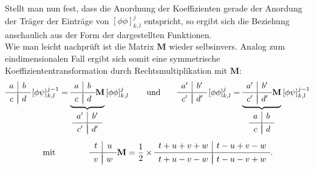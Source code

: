 %
Stellt man nun fest, dass die Anordnung der Koeffizienten gerade der Anordung der Träger der Einträge von $\left[ \phi\phi \right]_{k,l}^j$ entspricht, so ergibt sich die Beziehung anschaulich aus der Form der dargestellten Funktionen.\\
%
Wie man leicht nachprüft ist die Matrix $\mathbf{M}$ wieder selbsinvers. Analog zum eindimensionalen Fall ergibt sich somit eine symmetrische Koeffiziententransformation durch Rechtsmultiplikation mit $\mathbf{M}$:
%
\[
\begin{array}{c|c}
a & b \\[.05cm] 
\hline \\[-0.35cm]
c & d
\end{array}
\left[ \phi\psi \right]_{k,l}^{j-1}
=
\underbrace{
\begin{array}{c|c}
a & b \\[.05cm] 
\hline \\[-0.35cm]
c & d
\end{array}
\mathbf{M}
}_{
\begin{array}{c|c}
a' & b' \\[.05cm] 
\hline \\[-0.35cm]
c' & d'
\end{array}
}
\left[ \phi\phi \right]_{k,l}^j
\qquad \mbox{und} \qquad
\begin{array}{c|c}
a' & b' \\[.05cm] 
\hline \\[-0.35cm]
c' & d'
\end{array}
\left[ \phi\phi \right]_{k,l}^{j}
=
\underbrace{
\begin{array}{c|c}
a' & b' \\[.05cm] 
\hline \\[-0.35cm]
c' & d'
\end{array}
\mathbf{M}
}_{
\begin{array}{c|c}
a & b \\[.05cm] 
\hline \\[-0.35cm]
c & d
\end{array}
}
\left[ \phi\psi \right]_{k,l}^{j-1}
\]
%
\[
\mbox{mit} \qquad \qquad
\begin{array}{c|c}
t & u \\[.05cm] 
\hline \\[-0.35cm]
v & w
\end{array}
\mathbf{M}
=
\frac{1}{2} \times
\begin{array}{c|c}
t+u+v+w & t-u+v-w \\[.05cm] 
\hline \\[-0.35cm]
t+u-v-w & t-u-v+w
\end{array}
.
\]
